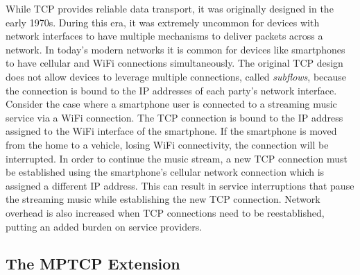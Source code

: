\documentclass[sigplan,screen,nonacm]{acmart}
\begin{document}
While TCP provides reliable data transport, it was originally designed in the early 1970s. During this era, it was extremely uncommon for devices with network interfaces to have multiple mechanisms to deliver packets across a network. In today’s modern networks it is common for devices like smartphones to have cellular and WiFi connections simultaneously. The original TCP design does not allow devices to leverage multiple connections, called \emph{subflows}, because the connection is bound to the IP addresses of each party's network interface. \cite{MPTCPoverview:2012} Consider the case where a smartphone user is connected to a streaming music service via a WiFi connection. The TCP connection is bound to the IP address assigned to the WiFi interface of the smartphone. If the smartphone is moved from the home to a vehicle, losing WiFi connectivity, the connection will be interrupted. In order to continue the music stream, a new TCP connection must be established using the smartphone’s cellular network connection which is assigned a different IP address. This can result in service interruptions that pause the streaming music while establishing the new TCP connection. Network overhead is also increased when TCP connections need to be reestablished, putting an added burden on service providers.

\subsection{The MPTCP Extension}
\label{sec:mptcp}
\end{document}
